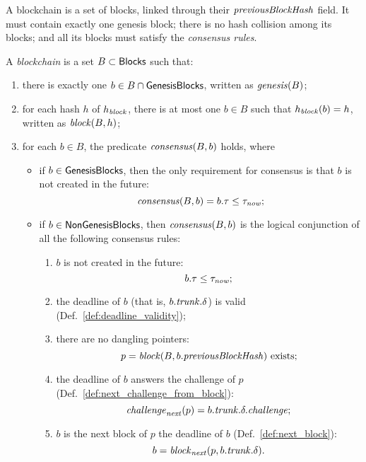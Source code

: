 A blockchain is a set of blocks, linked through their ${\mathit{previousBlockHash}}$ field.
It must contain exactly one genesis block; there is no hash collision among its blocks;
and all its blocks must satisfy the \emph{consensus rules}.
%
\begin{definition}\label{def:blockchain}
  A \emph{blockchain} is a set $B\subset{\mathsf{Blocks}}$ such that:
  \begin{enumerate}
  \item\label{prop:blockchain:genesis} there is exactly one $b\in B\cap{\mathsf{GenesisBlocks}}$, written as ${\mathit{genesis}}(B)$;
  \item\label{prop:blockchain:no_collision} for each hash $h$ of $h_{\mathit{block}}$, there is at most
    one $b\in B$ such that $h_{\mathit{block}}(b)=h$, written as ${\mathit{block}}(B,h)$;
  \item\label{prop:blockchain:consensus} for each $b\in B$, the predicate ${\mathit{consensus}}(B,b)$ holds, where
    \begin{itemize}
    \item if $b\in{\mathsf{GenesisBlocks}}$, then the only requirement for consensus is that
      $b$ is not created in the future:
      \[
      {\mathit{consensus}}(B,b)=b.\tau\le\tau_{\mathit{now}};
      \]
    \item if $b\in{\mathsf{NonGenesisBlocks}}$, then ${\mathit{consensus}}(B,b)$ is the logical conjunction
      of all the following consensus rules:
      \begin{enumerate}[label=(\alph*)]
      \item\label{prop:consensus:no_future} $b$ is not created in the future:
        \[
        b.\tau\le\tau_{\mathit{now}};
        \]
      \item\label{prop:consensus:valid} the deadline of $b$ (that is, $b.{\mathit{trunk}}.\delta$) is valid (Def.~\ref{def:deadline_validity});
      \item\label{prop:consensus:no_dangling} there are no dangling pointers:
        \[
        p={\mathit{block}}(B,b.{\mathit{previousBlockHash}})\text{ exists;}
        \]
      \item\label{prop:consensus:answer} the deadline of $b$ answers the challenge of $p$ (Def.~\ref{def:next_challenge_from_block}):
        \[
        {\mathit{challenge}}_{\mathit{next}}(p)=b.{\mathit{trunk}}.\delta.{\mathit{challenge}};
        \]
      \item\label{prop:consensus:next_block} $b$ is the next block of $p$ \wrt the deadline of $b$ (Def.~\ref{def:next_block}):
        \[
        b={\mathit{block}}_{\mathit{next}}(p,b.{\mathit{trunk}}.\delta).
        \]
      \end{enumerate}
    \end{itemize}
  \end{enumerate}
\end{definition}
